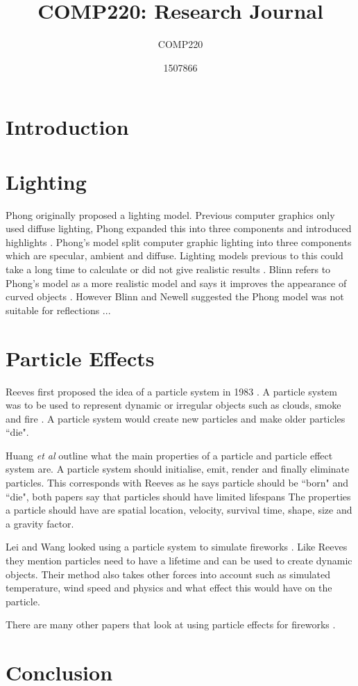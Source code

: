 \documentclass{scrartcl}
\title{COMP220: Research Journal}
\subtitle{COMP220}
\author{1507866}
\begin{document}
	
\maketitle

	
\section{Introduction}


\section{Lighting}
Phong originally proposed a lighting model.  Previous computer graphics only used diffuse lighting, Phong expanded this into three components and introduced highlights \cite{Kajiya}. Phong's model split computer graphic lighting into three components which are specular, ambient and diffuse. Lighting models previous to this could take a long time to calculate or did not give realistic results \cite{Phong}.
Blinn refers to Phong's model as a more realistic model and says it improves the appearance of curved objects \cite{Blinn}. However Blinn and Newell suggested the Phong model was not suitable for reflections \cite{BlinnNewell}...

	
\section{Particle Effects}
Reeves first proposed the idea of a particle system in 1983 \cite{Reeves}. A particle system was to be used to represent dynamic or irregular objects such as clouds, smoke and fire \cite{Reeves, Lei}. A particle system would create new particles and make older particles ``die".

Huang \textit{et al} outline what the main properties of a particle and particle effect system are. \cite{Huang}
A particle system should initialise, emit, render and finally eliminate particles. This corresponds with Reeves as he says particle should be ``born" and ``die", both papers say that particles should have limited lifespans
The properties a particle should have are spatial location, velocity, survival  time, shape, size and a gravity factor. \cite{Huang}



Lei and Wang looked using a particle system to simulate fireworks \cite{Lei}. Like Reeves they mention particles need to have a lifetime and can be used to create dynamic objects. Their method also takes other forces into account such as simulated temperature, wind speed and physics and what effect this would have on the particle\cite{Lei}.

There are many other papers that look at using particle effects for fireworks \cite{Dong, Zhang}.
\section{Conclusion}

	


	
\end{document}

